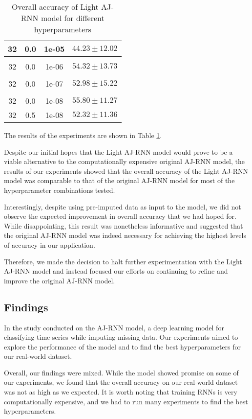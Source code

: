 \begin{table}[H]
\begin{tabular}{cccr}
      32  & 0.0 & 1e-05 & $44.23 \pm 12.02$\\[0.05cm] \hline \\[-0.25cm]
      32  & 0.0 & 1e-06 & $54.32 \pm 13.73$\\[0.05cm] \hline \\[-0.25cm]
      32  & 0.0 & 1e-07 & $52.98 \pm 15.22$\\[0.05cm] \hline \\[-0.25cm]
      32  & 0.0 & 1e-08 & $55.80 \pm 11.27$\\
      32  & 0.5 & 1e-08 & $52.32 \pm 11.36$\\
  \end{tabular}
  \caption{Overall accuracy of Light AJ-RNN model for different hyperparameters}
  \label{tab:LightAJRNNBatchSizeResults}
\end{table}

The results of the experiments are shown in Table \ref{tab:LightAJRNNBatchSizeResults}.

Despite our initial hopes that the Light AJ-RNN model would prove to be a viable alternative to the computationally expensive original AJ-RNN model, the results of our experiments showed that the overall accuracy of the Light AJ-RNN model was comparable to that of the original AJ-RNN model for most of the hyperparameter combinations tested.

Interestingly, despite using pre-imputed data as input to the model, we did not observe the expected improvement in overall accuracy that we had hoped for. 
While disappointing, this result was nonetheless informative and suggested that the original AJ-RNN model was indeed necessary for achieving the highest levels of accuracy in our application.

Therefore, we made the decision to halt further experimentation with the Light AJ-RNN model and instead focused our efforts on continuing to refine and improve the original AJ-RNN model. 


\subsection{Findings}

In the study conducted on the AJ-RNN model, a deep learning model for classifying time series while imputing missing data.
Our experiments aimed to explore the performance of the model and to find the best hyperparameters for our real-world dataset.

Overall, our findings were mixed. 
While the model showed promise on some of our experiments, we found that the overall accuracy on our real-world dataset was not as high as we expected.
It is worth noting that training RNNs is very computationally expensive, and we had to run many experiments to find the best hyperparameters.

